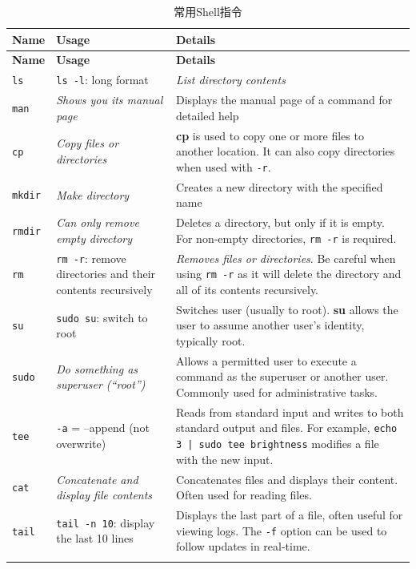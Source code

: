 \begin{longtable}{|l|p{5cm}|p{8cm}|}
\hline
\textbf{Name} & \textbf{Usage} & \textbf{Details} \\
\hline
\endfirsthead
\hline
\textbf{Name} & \textbf{Usage} & \textbf{Details} \\
\hline
\endhead
\hline
\endfoot

\texttt{ls} & \texttt{ls -l}: long format & \textit{List directory contents} \\
\hline
\texttt{man} & \textit{Shows you its manual page} & Displays the manual page of a command for detailed help \\
\hline
\texttt{cp} & \textit{Copy files or directories} & \textbf{cp} is used to copy one or more files to another location. It can also copy directories when used with \texttt{-r}. \\
\hline
\texttt{mkdir} & \textit{Make directory} & Creates a new directory with the specified name \\
\hline
\texttt{rmdir} & \textit{Can only remove empty directory} & Deletes a directory, but only if it is empty. For non-empty directories, \texttt{rm -r} is required. \\
\hline
\texttt{rm} & \texttt{rm -r}: remove directories and their contents recursively & \textit{Removes files or directories}. Be careful when using \texttt{rm -r} as it will delete the directory and all of its contents recursively. \\
\hline
\texttt{su} & \texttt{sudo su}: switch to root & Switches user (usually to root). \textbf{su} allows the user to assume another user's identity, typically root. \\
\hline
\texttt{sudo} & \textit{Do something as superuser (“root”)} & Allows a permitted user to execute a command as the superuser or another user. Commonly used for administrative tasks. \\
\hline
\texttt{tee} & \texttt{-a} = --append (not overwrite) & Reads from standard input and writes to both standard output and files. For example, \texttt{echo 3 | sudo tee brightness} modifies a file with the new input. \\
\hline
\texttt{cat} & \textit{Concatenate and display file contents} & Concatenates files and displays their content. Often used for reading files. \\
\hline
\texttt{tail} & \texttt{tail -n 10}: display the last 10 lines & Displays the last part of a file, often useful for viewing logs. The \texttt{-f} option can be used to follow updates in real-time. \\
\hline

\caption{常用Shell指令}
\label{tab:shellcommands}

\end{longtable}

